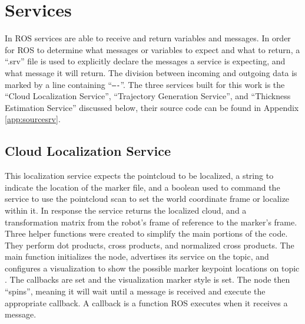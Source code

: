 \section{Services}
In ROS services are able to receive and return variables and messages. In order for ROS to determine what messages or variables to expect and what to return, a ``.srv'' file is used to explicitly declare the messages a service is expecting, and what message it will return. The division between incoming and outgoing data is marked by a line containing ``\texttt{----}''. The three services built for this work is the ``Cloud Localization Service'', ``Trajectory Generation Service'', and ``Thickness Estimation Service'' discussed below, their source code can be found in Appendix \ref{app:sourcesrv}.\\
\subsection{Cloud Localization Service}
This localization service expects the pointcloud to be localized, a string to indicate the location of the marker file, and a boolean used to command the service to use the pointcloud scan to set the world coordinate frame or localize within it. In response the service returns the localized cloud, and a transformation matrix from the robot's frame of reference to the marker's frame.\\
%
  
Three helper functions were created to simplify the main portions of the code. They perform dot products, cross products, and normalized cross products. The main function initializes the node, advertises its service on the  topic, and configures a visualization to show the possible marker keypoint locations on topic . The  callbacks are set and the visualization marker style is set. The node then ``spins'', meaning it will wait until a message is received and execute the appropriate callback. A callback is a function ROS executes when it receives a message.\\

